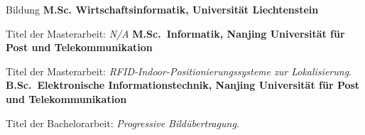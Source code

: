 \begin{rubric}{Bildung}
\entry*[2024 -- jetzt]%
	\textbf{M.Sc. Wirtschaftsinformatik, Universit\"at Liechtenstein}
	\par Titel der Masterarbeit: \emph{N/A}
%
\entry*[2020 -- 2023]
	\textbf{M.Sc.~Informatik, Nanjing Universität für Post und Telekommunikation}\par
	\par Titel der Masterarbeit: \emph{RFID-Indoor-Positionierungssysteme zur Lokalisierung}.
% 
\entry*[2016 -- 2020]%
	\textbf{B.Sc.~Elektronische Informationstechnik, Nanjing Universität für Post und Telekommunikation}\par
	\par Titel der Bachelorarbeit: \emph{Progressive Bildübertragung.}
\end{rubric}